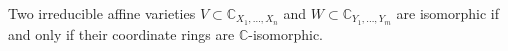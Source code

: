 Two irreducible affine varieties $V \subset \mathbb{C}_{X_1, \ldots, X_n}$ and $W \subset \mathbb{C}_{Y_1, \ldots, Y_m}$ are isomorphic if and only if their coordinate rings are $\mathbb{C}$-isomorphic.
